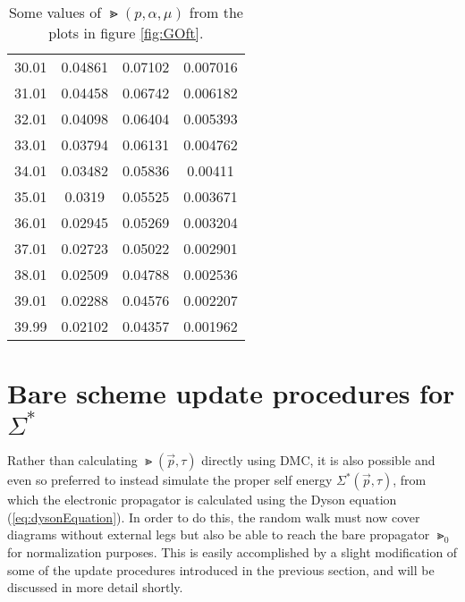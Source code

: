 \begin{table}[H]
\begin{center}
\begin{tabular}{r | c | c | c}
30.01 & 0.04861 & 0.07102 & 0.007016 \\
31.01 & 0.04458 & 0.06742 & 0.006182 \\
32.01 & 0.04098 & 0.06404 & 0.005393 \\
33.01 & 0.03794 & 0.06131 & 0.004762 \\
34.01 & 0.03482 & 0.05836 & 0.00411 \\
35.01 & 0.0319 & 0.05525 & 0.003671 \\
36.01 & 0.02945 & 0.05269 & 0.003204 \\
37.01 & 0.02723 & 0.05022 & 0.002901 \\
38.01 & 0.02509 & 0.04788 & 0.002536 \\
39.01 & 0.02288 & 0.04576 & 0.002207 \\
39.99 & 0.02102 & 0.04357 & 0.001962 \\
		\end{tabular}
	\end{center}
	\caption{Some values of $ \Gt(p, \alpha, \mu) $ from the plots in figure \ref{fig:GOft}.}
	\label{tab:truthTables}   
\end{table}

\section{Bare scheme update procedures for $ \Sigma^* $}

Rather than calculating $ \Gt(\vec p, \tau) $ directly using DMC, it is also possible and even so preferred  to instead simulate the proper self energy $ \Sigma^*(\vec p, \tau) $, from which the electronic propagator is calculated using the Dyson equation (\ref{eq:dysonEquation}).
In order to do this, the random walk must now cover diagrams without external legs but also be able to reach the bare propagator $ \Gt_0 $ for normalization purposes. This is easily accomplished by a slight modification of some of the update procedures introduced in the previous section, and will be discussed in more detail shortly.

